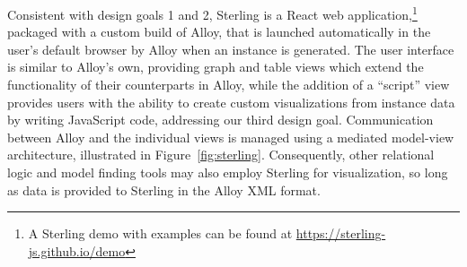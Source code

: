 \documentclass[runningheads]{llncs}
\begin{document}
Consistent with design goals 1 and 2, Sterling is a React web application,\footnote{A Sterling demo with examples can be found at \href{https://sterling-js.github.io/demo}{https://sterling-js.github.io/demo}} packaged with a custom build of Alloy, that is launched automatically in the user's default browser by Alloy when an instance is generated. 
The user interface is similar to Alloy's own, providing graph and table views which extend the functionality of their counterparts in Alloy, while the addition of a ``script'' view provides users with the ability to create custom visualizations from instance data by writing JavaScript code, addressing our third design goal.
Communication between Alloy and the individual views is managed using a mediated model-view architecture, illustrated in Figure~\ref{fig:sterling}. Consequently, other relational logic and model finding tools may also employ Sterling for visualization, so long as data is provided to Sterling in the Alloy XML format.
\end{document}
